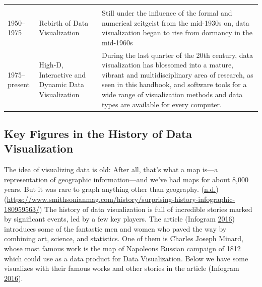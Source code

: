 \documentclass[]{book}
\begin{document}
\begin{longtable}[]{@{}lll@{}}
\begin{minipage}[t]{0.69\columnwidth}
\end{minipage}\tabularnewline
\begin{minipage}[t]{0.11\columnwidth}\raggedright
1950--1975\strut
\end{minipage} & \begin{minipage}[t]{0.11\columnwidth}\raggedright
Rebirth of Data Visualization\strut
\end{minipage} & \begin{minipage}[t]{0.69\columnwidth}\raggedright
Still under the influence of the formal and numerical zeitgeist from the mid-1930s on, data visualization began to rise from dormancy in the mid-1960s\strut
\end{minipage}\tabularnewline
\begin{minipage}[t]{0.11\columnwidth}\raggedright
1975--present\strut
\end{minipage} & \begin{minipage}[t]{0.11\columnwidth}\raggedright
High-D, Interactive and Dynamic Data Visualization\strut
\end{minipage} & \begin{minipage}[t]{0.69\columnwidth}\raggedright
During the last quarter of the 20th century, data visualization has blossomed into a mature, vibrant and multidisciplinary area of research, as seen in this handbook, and software tools for a wide range of visualization methods and data types are available for every computer.\strut
\end{minipage}\tabularnewline
\bottomrule
\end{longtable}

\hypertarget{key-figures-in-the-history-of-data-visualization}{%
\subsection{Key Figures in the History of Data Visualization}\label{key-figures-in-the-history-of-data-visualization}}

The idea of visualizing data is old: After all, that's what a map is---a representation of geographic information---and we've had maps for about 8,000 years. But it was rare to graph anything other than geography.
(\protect\hyperlink{ref-history_dataviz}{n.d.})(\url{https://www.smithsonianmag.com/history/surprising-history-infographic-180959563/})
The history of data visualization is full of incredible stories marked by significant events, led by a few key players. The article (Infogram \protect\hyperlink{ref-history_viz}{2016}) introduces some of the fantastic men and women who paved the way by combining art, science, and statistics. One of them is Charles Joseph Minard, whose most famous work is the map of Napoleons Russian campaign of 1812 which could use as a data product for Data Visualization. Below we have some visualizes with their famous works and other stories in the article (Infogram \protect\hyperlink{ref-history_viz}{2016}).
\end{document}
